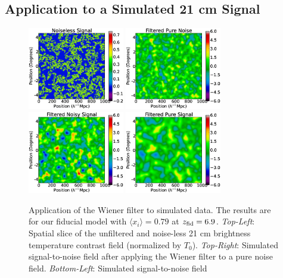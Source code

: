 \subsection{Application to a Simulated 21 cm Signal} \label{sec:Bubblewapplied}

\begin{figure}[t]
  \includegraphics[width=4.2cm]{f2a.eps}
  \includegraphics[width=4.2cm]{f2b.eps}
  \includegraphics[width=4.2cm]{f2c.eps}
  \includegraphics[width=4.2cm]{f2d.eps}
  \caption{Application of the Wiener filter to simulated data. The
results are for our fiducial model with $\langle x_i \rangle = 0.79$ at $z_{\rm fid} = 6.9$. \textit{Top-Left}:
    Spatial slice of the unfiltered and noise-less 21 cm brightness
    temperature contrast field (normalized by
    $T_0$). \textit{Top-Right}: Simulated signal-to-noise field after
    applying the Wiener filter to a pure noise
    field. \textit{Bottom-Left}: Simulated signal-to-noise field
}
\end{figure}
